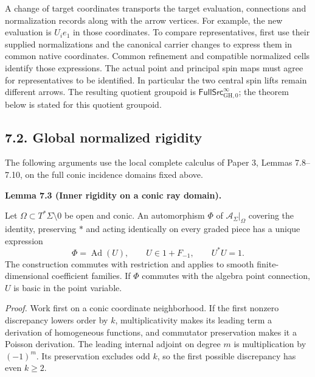 \documentclass[
  english,
  11pt,
  reqno]{amsart}
\makeatletter
\newcommand{\pandocstatementheading}[1]{%
  \par\addpenalty{\@beginparpenalty}%
  \addvspace{.5\baselineskip plus .2\baselineskip minus .2\baselineskip}%
  {\normalfont\bfseries #1\par}%
  \nobreak\@afterindenttrue\@afterheading
}
\makeatother
\begin{document}
A change of target coordinates transports the target evaluation,
connections and normalization records along with the arrow vertices. For
example, the new evaluation is \(U_i e_1\) in those coordinates. To
compare representatives, first use their supplied normalizations and the
canonical carrier changes to express them in common native coordinates.
Common refinement and compatible normalized cells identify those
expressions. The actual point and principal spin maps must agree for
representatives to be identified. In particular the two central spin
lifts remain different arrows. The resulting quotient groupoid is
\(\mathsf{FullSrc}^{\infty}_{\mathrm{GH},0}\); the theorem below is
stated for this quotient groupoid.

\protect{}\label{sec:global-normalized-rigidity}

\subsection{7.2. Global normalized
rigidity}\label{global-normalized-rigidity}

The following arguments use the local complete calculus of Paper 3,
Lemmas 7.8--7.10, on the full conic incidence domains fixed above.

\pandocstatementheading{\protect{}\label{lem:global-normalized-inner-rigidity}Lemma 7.3 (Inner rigidity on a conic ray domain).}

Let \(\Omega\subset T^*\Sigma\setminus0\) be open and conic. An
automorphism \(\Phi\) of \(\mathcal A_\Sigma|_\Omega\) covering the
identity, preserving \(*\) and acting identically on every graded piece
has a unique expression \[
\Phi=\operatorname{Ad}(U),
\qquad U\in1+F_{-1},\qquad U^*U=1.
\] The construction commutes with restriction and applies to smooth
finite-dimensional coefficient families. If \(\Phi\) commutes with the
algebra point connection, \(U\) is basic in the point variable.

\emph{Proof.} Work first on a conic coordinate neighborhood. If the
first nonzero discrepancy lowers order by \(k\), multiplicativity makes
its leading term a derivation of homogeneous functions, and commutator
preservation makes it a Poisson derivation. The leading internal adjoint
on degree \(m\) is multiplication by \((-1)^m\). Its preservation
excludes odd \(k\), so the first possible discrepancy has even
\(k\ge2\).
\end{document}
